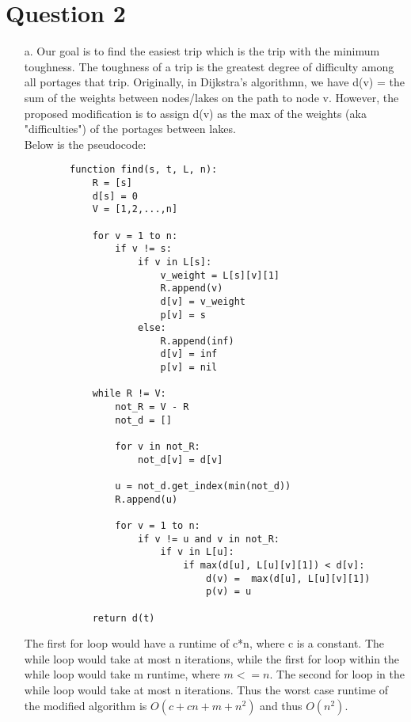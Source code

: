 \documentclass[12pt]{article}
\begin{document}
\section*{Question 2}
\begin{enumerate}
    \item[a.] Our goal is to find the easiest trip which is the trip with the minimum toughness. The toughness 
    of a trip is the greatest degree of difficulty among all portages that trip. Originally, in Dijkstra’s 
    algorithmn, we have d(v) = the sum of the weights between nodes/lakes on the path to node v. However, 
    the proposed modification is to assign d(v) as the max of the weights (aka "difficulties") of the portages 
    between lakes. \\

    Below is the pseudocode:

    \begin{verbatim}
        function find(s, t, L, n):
            R = [s]
            d[s] = 0
            V = [1,2,...,n]

            for v = 1 to n:
                if v != s:
                    if v in L[s]:
                        v_weight = L[s][v][1]
                        R.append(v)
                        d[v] = v_weight
                        p[v] = s
                    else:
                        R.append(inf)
                        d[v] = inf
                        p[v] = nil
            
            while R != V:
                not_R = V - R
                not_d = []

                for v in not_R:
                    not_d[v] = d[v]
        
                u = not_d.get_index(min(not_d))
                R.append(u)

                for v = 1 to n:
                    if v != u and v in not_R:
                        if v in L[u]:
                            if max(d[u], L[u][v][1]) < d[v]: 
                                d(v) =  max(d[u], L[u][v][1])
                                p(v) = u

            return d(t)
    \end{verbatim}

    The first for loop would have a runtime of c*n, where c is a constant. The while loop would take at most
    n iterations, while the first for loop within the while loop would take m runtime, where $m <= n$. The second
    for loop in the while loop would take at most n iterations. Thus the worst case runtime of the modified
    algorithm is $O(c + cn + m + n^2)$ and thus $O(n^2)$.


\end{enumerate}
\end{document}
